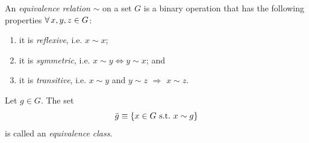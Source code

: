 An {\it equivalence relation} $\sim$ on a
set $G$ is a binary operation that has the following properties
$\operatorname{\forall} x,y,z\in G$:
\begin{enumerate}
  \item it is {\it reflexive}, i.e. $x\sim x$;
  \item it is {\it symmetric}, i.e.
        $x\sim y\Leftrightarrow y\sim x$; and
  \item it is {\it transitive}, i.e. $x\sim y$ and
        $y\sim z$ $\Rightarrow$ $x\sim z$.
\end{enumerate}
Let $g\in G$. The set
\begin{equation}
\bar{g}\equiv\{x\in G~\text{s.t.}~ x\sim g\}
\end{equation}
is called an 
{\it equivalence class}.


